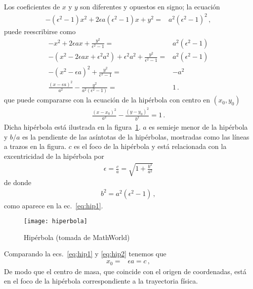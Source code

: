 \begin{frame}
  
Los coeficientes de $x$ y $y$ son diferentes y opuestos en signo; la ecuación
  \begin{align}
    -(\epsilon^2-1)x^2+2\epsilon a(\epsilon^2-1)x+y^2=&a^2(\epsilon^2-1)^2\,,
  \end{align}
puede reescribirse como
\begin{align}
  \label{eq:hip1}
-x^2+2\epsilon ax + \frac{y^2}{\epsilon^2-1}=&a^2(\epsilon^2-1)\nonumber\\
-(x^2-2\epsilon ax+\epsilon^2a^2)+\epsilon^2a^2 + \frac{y^2}{\epsilon^2-1}=&a^2(\epsilon^2-1)\nonumber\\
-(x^2-\epsilon a)^2+ \frac{y^2}{\epsilon^2-1}=&-a^2\nonumber\\
\frac{(x-\epsilon a)^2}{a^2}-\frac{y^2}{a^2(\epsilon^2-1)}=&1\,.
\end{align}
que puede compararse con la ecuación de la hipérbola con centro en $(x_0,y_0)$
\begin{align}
  \label{eq:hip2}
\frac{(x-x_0)^2}{a^2}-\frac{(y-y_0)^2}{b^2}=1\,.
\end{align}
Dicha hipérbola está ilustrada en la figura~\ref{fig:hiperbola}. $a$ es semieje menor de la hipérbola y $b/a$ es la pendiente de las asíntotas de la hipérbolas, mostradas como las líneas a trazos en la figura. $c$ es el foco de la hipérbola y está relacionada con la excentricidad de la hipérbola por %
\begin{align}
  \epsilon=\frac{c}{a}=\sqrt{1+\frac{b^2}{a^2}}
\end{align}
de donde
\begin{align}
  b^2=a^2(\epsilon^2-1)\,,
\end{align}
como aparece en la ec.~\eqref{eq:hip1}.
\end{frame}

\begin{frame}
\begin{figure}
  \centering
  \texttt{[image: hiperbola]}
  \caption{Hipérbola (tomada de MathWorld)}
  \label{fig:hiperbola}
\end{figure}
\end{frame}
Comparando la ecs.~\eqref{eq:hip1} y \eqref{eq:hip2} tenemos que 
\begin{align}
  x_0=&\epsilon a=c\,,
\end{align}
De modo que el centro de masa, que coincide con el origen de coordenadas, está en el foco de la hipérbola correspondiente a la trayectoria física.

